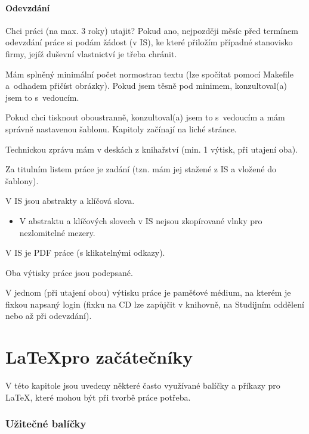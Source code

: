 \subsubsection*{Odevzdání}

\begin{checklist}
\item Chci práci (na max. 3 roky) utajit? Pokud ano, nejpozději měsíc před termínem odevzdání práce si podám žádost (v IS), ke které přiložím případné stanovisko firmy, jejíž duševní vlastnictví je třeba chránit.
\item Mám splněný minimální počet normostran textu (lze spočítat pomocí Makefile a~odhadem přičíst obrázky). Pokud jsem těsně pod minimem, konzultoval(a) jsem to s~vedoucím.
\item Pokud chci tisknout oboustranně, konzultoval(a) jsem to s~vedoucím a mám správně nastavenou šablonu. Kapitoly začínají na liché stránce.
\item Technickou zprávu mám v deskách z knihařství (min. 1 výtisk, při utajení oba).
\item Za titulním listem práce je zadání (tzn. mám jej stažené z IS a vložené do šablony).
\item V IS jsou abstrakty a klíčová slova.
  \begin{itemize}
    \item V abstraktu a klíčových slovech v IS nejsou zkopírované vlnky pro nezlomitelné mezery.
  \end{itemize}      
\item V IS je PDF práce (s klikatelnými odkazy).
\item Oba výtisky práce jsou podepsané.
\item V jednom (při utajení obou) výtisku práce je paměťové médium, na kterém je fixkou napsaný login (fixku na CD lze zapůjčit v knihovně, na Studijním oddělení nebo až při odevzdání).
\end{checklist}


\chapter{\LaTeX pro začátečníky}
\label{latex}

V této kapitole jsou uvedeny některé často využívané balíčky a příkazy pro \LaTeX{}, které mohou být při tvorbě práce potřeba.

\subsection*{Užitečné balíčky}


